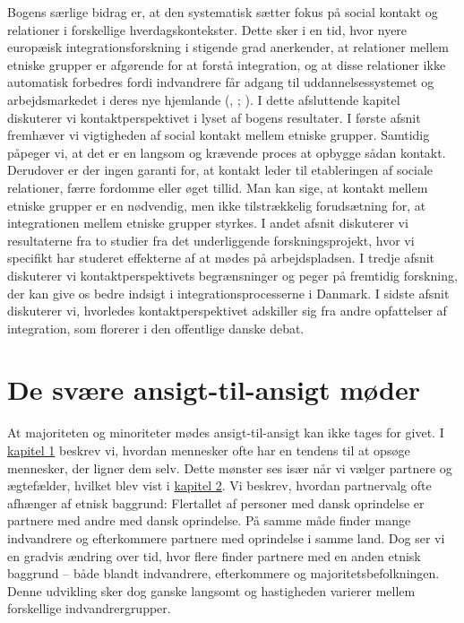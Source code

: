\documentclass[
]{book}
\begin{document}
Bogens særlige bidrag er, at den systematisk sætter fokus på social kontakt og relationer i forskellige hverdagskontekster. Dette sker i en tid, hvor nyere europæisk integrationsforskning i stigende grad anerkender, at relationer mellem etniske grupper er afgørende for at forstå integration, og at disse relationer ikke automatisk forbedres fordi indvandrere får adgang til uddannelsessystemet og arbejdsmarkedet i deres nye hjemlande (, ; ). I dette afsluttende kapitel diskuterer vi kontaktperspektivet i lyset af bogens resultater. I første afsnit fremhæver vi vigtigheden af social kontakt mellem etniske grupper. Samtidig påpeger vi, at det er en langsom og krævende proces at opbygge sådan kontakt. Derudover er der ingen garanti for, at kontakt leder til etableringen af sociale relationer, færre fordomme eller øget tillid. Man kan sige, at kontakt mellem etniske grupper er en nødvendig, men ikke tilstrækkelig forudsætning for, at integrationen mellem etniske grupper styrkes. I andet afsnit diskuterer vi resultaterne fra to studier fra det underliggende forskningsprojekt, hvor vi specifikt har studeret effekterne af at mødes på arbejdspladsen. I tredje afsnit diskuterer vi kontaktperspektivets begrænsninger og peger på fremtidig forskning, der kan give os bedre indsigt i integrationsprocesserne i Danmark. I sidste afsnit diskuterer vi, hvorledes kontaktperspektivet adskiller sig fra andre opfattelser af integration, som florerer i den offentlige danske debat.

\section{De svære ansigt-til-ansigt møder}\label{de-svuxe6re-ansigt-til-ansigt-muxf8der}

At majoriteten og minoriteter mødes ansigt-til-ansigt kan ikke tages for givet. I \hyperref[kap1]{kapitel 1} beskrev vi, hvordan mennesker ofte har en tendens til at opsøge mennesker, der ligner dem selv. Dette mønster ses især når vi vælger partnere og ægtefælder, hvilket blev vist i \hyperref[kap2]{kapitel 2}. Vi beskrev, hvordan partnervalg ofte afhænger af etnisk baggrund: Flertallet af personer med dansk oprindelse er partnere med andre med dansk oprindelse. På samme måde finder mange indvandrere og efterkommere partnere med oprindelse i samme land. Dog ser vi en gradvis ændring over tid, hvor flere finder partnere med en anden etnisk baggrund -- både blandt indvandrere, efterkommere og majoritetsbefolkningen. Denne udvikling sker dog ganske langsomt og hastigheden varierer mellem forskellige indvandrergrupper.
\end{document}
